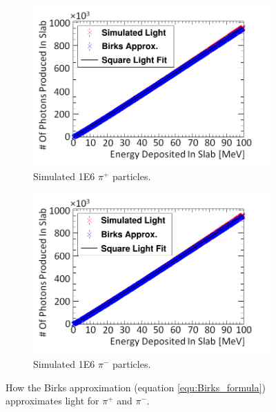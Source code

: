 \begin{figure}[htbp]
\centering
\begin{subfigure}{.5\textwidth}
  \centering
  \includegraphics[width=\linewidth]{Appendix5/newNewFigs/pi+BirksSlab_simAndApproxLight.png}
  \captionsetup{width=.9\linewidth}
  \caption{Simulated 1E6 $\pi^+$ particles.}
  \label{subfig:append5_light_of_pIPlus0-100mev}
\end{subfigure}%
\begin{subfigure}{.5\textwidth}
  \centering
  \includegraphics[width=\linewidth]{Appendix5/newNewFigs/pi-BirksSlab_simAndApproxLight.png}
  \captionsetup{width=.9\linewidth}
  \caption{Simulated 1E6 $\pi^-$ particles.}
  \label{subfig:append5_light_of_pIMinus0-100mev}
\end{subfigure}
\caption{How the Birks approximation (equation \ref{equ:Birks_formula}) approximates light for $\pi^+$ and $\pi^-$.}
\label{fig:append5_light_of_pIPlus_pIMinus0-100mev}
\end{figure}

